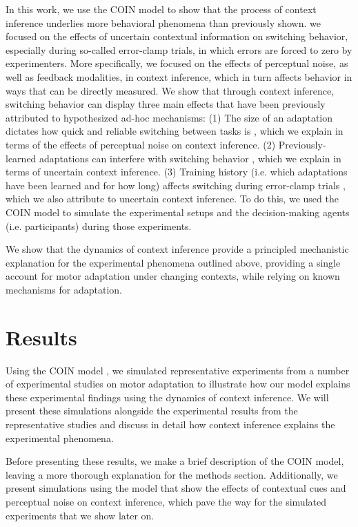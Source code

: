 \documentclass[a4paper,doc,floatsintext,natbib]{apa6}%
\begin{document}
In this work, we use the COIN model to show that the process of context inference underlies more behavioral phenomena than previously shown. we focused on the effects of uncertain contextual information on switching behavior, especially during so-called error-clamp trials, in which errors are forced to zero by experimenters. More specifically, we focused on the effects of perceptual noise, as well as feedback modalities, in context inference, which in turn affects behavior in ways that can be directly measured. We show that through context inference, switching behavior can display three main effects that have been previously attributed to hypothesized ad-hoc mechanisms: (1) The size of an adaptation dictates how quick and reliable switching between tasks is \cite{Oh_Minimizing_2019,Kim_Neural_2015}, which we explain in terms of the effects of perceptual noise on context inference. (2) Previously-learned adaptations can interfere with switching behavior \citep{Davidson_Scaling_2004}, which we explain in terms of uncertain context inference. (3) Training history (i.e. which adaptations have been learned and for how long) affects switching during error-clamp trials \citep{Vaswani_Decay_2013}, which we also attribute to uncertain context inference. To do this, we used the COIN model to simulate the experimental setups and the decision-making agents (i.e. participants) during those experiments.

We show that the dynamics of context inference provide a principled mechanistic explanation for the experimental phenomena outlined above, providing a single account for motor adaptation under changing contexts, while relying on known mechanisms for adaptation.

\section{Results}
Using the COIN model \citep{Heald_Contextual_2021}, we simulated representative experiments from a number of experimental studies on motor adaptation to illustrate how our model explains these experimental findings using the dynamics of context inference. We will present these simulations alongside the experimental results from the representative studies and discuss in detail how context inference explains the experimental phenomena.

Before presenting these results, we make a brief description of the COIN model, leaving a more thorough explanation for the methods section. Additionally, we present simulations using the model that show the effects of contextual cues and perceptual noise on context inference, which pave the way for the simulated experiments that we show later on.
\end{document}
